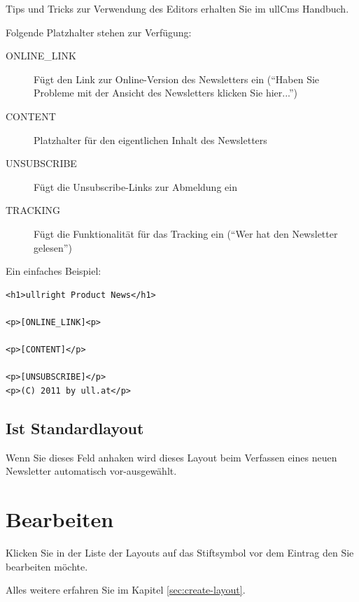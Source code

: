 \documentclass[article, a4paper, oneside, 11pt]{memoir}
\begin{document}
Tips und Tricks zur Verwendung des Editors erhalten Sie im ullCms Handbuch.


Folgende Platzhalter stehen zur Verfügung:

\begin{description}
 \item[\lbrack ONLINE\_LINK\rbrack] Fügt den Link zur Online-Version des Newsletters ein ("`Haben Sie Probleme mit der Ansicht des Newsletters klicken Sie hier..."')
 \item[\lbrack CONTENT\rbrack] Platzhalter für den eigentlichen Inhalt des Newsletters
 \item[\lbrack UNSUBSCRIBE\rbrack] Fügt die Unsubscribe-Links zur Abmeldung ein
 \item[\lbrack TRACKING\rbrack] Fügt die Funktionalität für das Tracking ein ("`Wer hat den Newsletter gelesen"')
\end{description}


Ein einfaches Beispiel:

\begin{lstlisting}
<h1>ullright Product News</h1>

<p>[ONLINE_LINK]<p>

<p>[CONTENT]</p>

<p>[UNSUBSCRIBE]</p>
<p>(C) 2011 by ull.at</p>
\end{lstlisting}

\subsection{Ist Standardlayout}

Wenn Sie dieses Feld anhaken wird dieses Layout beim Verfassen eines neuen Newsletter automatisch vor-ausgewählt.

\section{Bearbeiten}

Klicken Sie in der Liste der Layouts auf das Stiftsymbol vor dem Eintrag den Sie bearbeiten möchte.

Alles weitere erfahren Sie im Kapitel \vref{sec:create-layout}.
\end{document}
